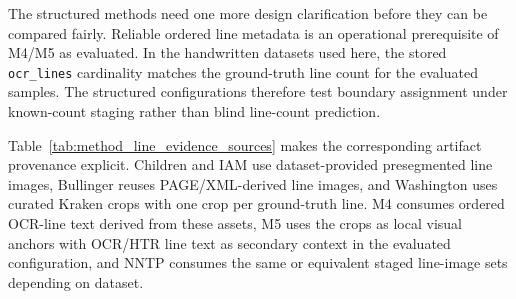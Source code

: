 The structured methods need one more design clarification before they can be compared fairly. Reliable ordered line metadata is an operational prerequisite of M4/M5 as evaluated. In the handwritten datasets used here, the stored \texttt{ocr\_lines} cardinality matches the ground-truth line count for the evaluated samples. The structured configurations therefore test boundary assignment under known-count staging rather than blind line-count prediction.

Table~\ref{tab:method_line_evidence_sources} makes the corresponding artifact provenance explicit. Children and IAM use dataset-provided presegmented line images, Bullinger reuses PAGE/XML-derived line images, and Washington uses curated Kraken crops with one crop per ground-truth line. M4 consumes ordered OCR-line text derived from these assets, M5 uses the crops as local visual anchors with OCR/HTR line text as secondary context in the evaluated configuration, and NNTP consumes the same or equivalent staged line-image sets depending on dataset.

